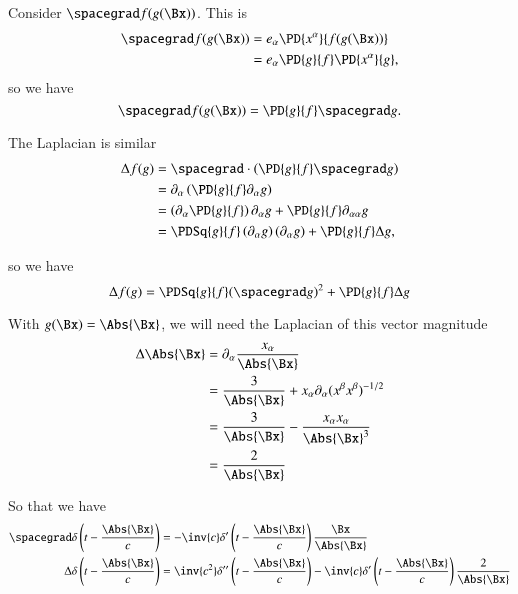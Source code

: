 Consider \(\spacegrad f(g(\Bx))\).  This is
%
\begin{equation}\label{eqn:relativisticElectrodynamicsL18:860}
\begin{aligned}
\spacegrad f(g(\Bx))
&=
e_\alpha \PD{x^\alpha}{f(g(\Bx))} \\
&=
e_\alpha \PD{g}{f} \PD{x^\alpha}{g},
\end{aligned}
\end{equation}
so we have
\begin{equation}\label{eqn:relativisticElectrodynamicsL18:400}
\spacegrad f(g(\Bx))
=
\PD{g}{f} \spacegrad g.
\end{equation}

The Laplacian is similar
%
\begin{equation}\label{eqn:relativisticElectrodynamicsL18:880}
\begin{aligned}
\Delta f(g)
&=
\spacegrad \cdot \left(\PD{g}{f} \spacegrad g \right) \\
&=
\partial_\alpha \left(\PD{g}{f} \partial_\alpha g \right) \\
&=
\left( \partial_\alpha \PD{g}{f} \right) \partial_\alpha g
+\PD{g}{f} \partial_{\alpha\alpha} g  \\
&=
\PDSq{g}{f} \left( \partial_\alpha g \right) (\partial_\alpha g)
+\PD{g}{f} \Delta g,
\end{aligned}
\end{equation}

so we have
%
\begin{equation}\label{eqn:relativisticElectrodynamicsL18:420}
\Delta f(g)
=
\PDSq{g}{f} (\spacegrad g)^2 +\PD{g}{f} \Delta g
\end{equation}

With \(g(\Bx) = \Abs{\Bx}\), we will need the Laplacian of this vector magnitude
%
\begin{equation}\label{eqn:relativisticElectrodynamicsL18:900}
\begin{aligned}
\Delta \Abs{\Bx}
&=
\partial_\alpha \frac{x_\alpha}{\Abs{\Bx}} \\
&=
\frac{3}{\Abs{\Bx}}
+ x_\alpha \partial_\alpha (x^\beta x^\beta)^{-1/2} \\
&=
\frac{3}{\Abs{\Bx}}
- \frac{x_\alpha x_\alpha}{\Abs{\Bx}^3} \\
&= \frac{2}{\Abs{\Bx}}
\end{aligned}
\end{equation}

So that we have
%
\begin{equation}\label{eqn:relativisticElectrodynamicsL18:440}
\begin{aligned}
\spacegrad \delta\left(t - \frac{\Abs{\Bx}}{c}\right) &=
-\inv{c} \delta'\left(t - \frac{\Abs{\Bx}}{c}\right) \frac{\Bx}{\Abs{\Bx}} \\
\Delta \delta\left(t - \frac{\Abs{\Bx}}{c}\right) &=
\inv{c^2} \delta''\left(t - \frac{\Abs{\Bx}}{c}\right) -\inv{c} \delta'\left(t - \frac{\Abs{\Bx}}{c}\right) \frac{2}{\Abs{\Bx}}
\end{aligned}
\end{equation}


